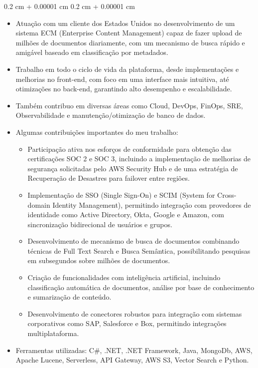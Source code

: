 \documentclass[10pt, letterpaper]{article}
\newenvironment{highlights}{
    \begin{itemize}[
        topsep=0.10 cm,
        parsep=0.10 cm,
        partopsep=0pt,
        itemsep=0pt,
        leftmargin=0.4 cm + 10pt
    ]
}{
    \end{itemize}
} %
\newenvironment{highlightsforbulletentries}{
    \begin{itemize}[
        topsep=0.10 cm,
        parsep=0.10 cm,
        partopsep=0pt,
        itemsep=0pt,
        leftmargin=10pt
    ]
}{
    \end{itemize}
} %
\newenvironment{onecolentry}{
    \begin{adjustwidth}{
        0.2 cm + 0.00001 cm
    }{
        0.2 cm + 0.00001 cm
    }
}{
    \end{adjustwidth}
} %
\begin{document}
        \vspace{0.10 cm}
        \begin{onecolentry}
            \begin{highlights}
                \item Atuação com um cliente dos Estados Unidos no desenvolvimento de um sistema ECM (Enterprise Content Management) capaz de fazer upload de milhões de documentos diariamente, com um mecanismo de busca rápido e amigável baseado em classificação por metadados.
                \item Trabalho em todo o ciclo de vida da plataforma, desde implementações e melhorias no front-end, com foco em uma interface mais intuitiva, até otimizações no back-end, garantindo alto desempenho e escalabilidade.
                \item Também contribuo em diversas áreas como Cloud, DevOps, FinOps, SRE, Observabilidade e manutenção/otimização de banco de dados.
                \item Algumas contribuições importantes do meu trabalho:
                \begin{highlightsforbulletentries}
                    \item Participação ativa nos esforços de conformidade para obtenção das certificações SOC 2 e SOC 3, incluindo a implementação de melhorias de segurança solicitadas pelo AWS Security Hub e de uma estratégia de Recuperação de Desastres para failover entre regiões.
                    \item Implementação de SSO (Single Sign-On) e SCIM (System for Cross-domain Identity Management), permitindo integração com provedores de identidade como Active Directory, Okta, Google e Amazon, com sincronização bidirecional de usuários e grupos.
                    \item Desenvolvimento de mecanismo de busca de documentos combinando técnicas de Full Text Search e Busca Semântica, possibilitando pesquisas em subsegundos sobre milhões de documentos.
                    \item Criação de funcionalidades com inteligência artificial, incluindo classificação automática de documentos, análise por base de conhecimento e sumarização de conteúdo.
                    \item Desenvolvimento de conectores robustos para integração com sistemas corporativos como SAP, Salesforce e Box, permitindo integrações multiplataforma.
                \end{highlightsforbulletentries}
                \item Ferramentas utilizadas: C\#, .NET, .NET Framework, Java, MongoDb, AWS, Apache Lucene, Serverless, API Gateway, AWS S3, Vector Search e Python.
            \end{highlights}
        \end{onecolentry}
\end{document}

